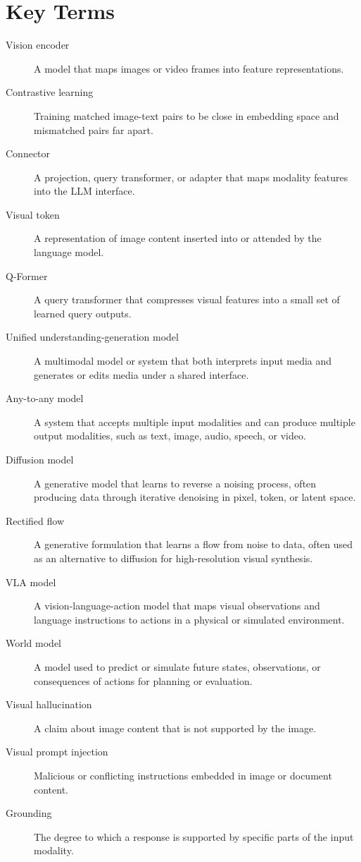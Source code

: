 \section{Key Terms}
\begin{description}
    \item[Vision encoder] A model that maps images or video frames into feature representations.
    \item[Contrastive learning] Training matched image-text pairs to be close in embedding space and mismatched pairs far apart.
    \item[Connector] A projection, query transformer, or adapter that maps modality features into the LLM interface.
    \item[Visual token] A representation of image content inserted into or attended by the language model.
    \item[Q-Former] A query transformer that compresses visual features into a small set of learned query outputs.
    \item[Unified understanding-generation model] A multimodal model or system that both interprets input media and generates or edits media under a shared interface.
    \item[Any-to-any model] A system that accepts multiple input modalities and can produce multiple output modalities, such as text, image, audio, speech, or video.
    \item[Diffusion model] A generative model that learns to reverse a noising process, often producing data through iterative denoising in pixel, token, or latent space.
    \item[Rectified flow] A generative formulation that learns a flow from noise to data, often used as an alternative to diffusion for high-resolution visual synthesis.
    \item[VLA model] A vision-language-action model that maps visual observations and language instructions to actions in a physical or simulated environment.
    \item[World model] A model used to predict or simulate future states, observations, or consequences of actions for planning or evaluation.
    \item[Visual hallucination] A claim about image content that is not supported by the image.
    \item[Visual prompt injection] Malicious or conflicting instructions embedded in image or document content.
    \item[Grounding] The degree to which a response is supported by specific parts of the input modality.
\end{description}

